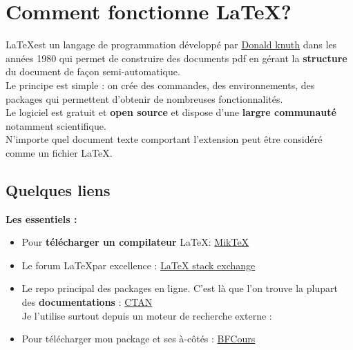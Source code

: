 \documentclass[a4paper,11pt,fleqn]{article}
\newcommand{\vocref}[2]{\href{#1}{\color{monrose}#2}}
\begin{document}
\setcounter{pagecounter}{0}
\setcounter{ExoMA}{0}
\setcounter{prof}{1}


\section{Comment fonctionne \LaTeX ?}

\LaTeX est un langage de programmation développé par \vocref{https://fr.wikipedia.org/wiki/Donald_Knuth}{Donald knuth} dans les années 1980 qui permet de construire des documents pdf en gérant la \textbf{structure} du document de façon semi-automatique.\\

Le principe est simple : on crée des commandes, des environnements, des packages qui permettent d'obtenir de nombreuses fonctionnalités.\\

Le logiciel est gratuit et \textbf{open source} et dispose d'une \textbf{largre communauté} notamment scientifique. \\

N'importe quel document texte comportant l'extension  peut être considéré comme un fichier \LaTeX. \\

\subsection{Quelques liens}

\textbf{Les essentiels :}\\
\begin{itemize}[label = \bccrayon]
	\item Pour \textbf{télécharger un compilateur} \LaTeX : \vocref{https://miktex.org/download}{MikTeX}
	\item Le forum \LaTeX par excellence : \vocref{https://tex.stackexchange.com/}{LaTeX stack exchange}
	\item Le repo principal des packages en ligne. C'est là que l'on trouve la plupart des \textbf{documentations} : \vocref{https://ctan.org/}{CTAN}\\
		Je l'utilise surtout depuis un moteur de recherche externe : 
	\item Pour télécharger mon package  et ses à-côtés : \vocref{https://github.com/Romain1099/BFCours.git}{BFCours}
\end{itemize}
\end{document}
